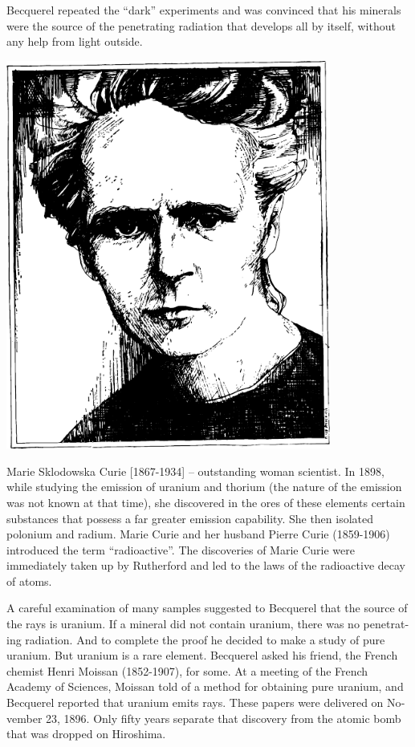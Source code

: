 Becquerel repeated the ``dark'' experiments and was convinced that his minerals were the source of the penetrating radiation that develops all by itself, without any help from light outside.


\begin{center}
\includegraphics[width=0.8\textwidth,angle=-0.5]{figures/curie.pdf}
\end{center}
{\small \textsf{{Marie Sklodowska Curie [1867-1934]}} -- \textsf{\footnotesize outstanding woman scien­tist. In 1898, while studying the emission of uranium and thorium (the nature of the emission was not known at that time), she discovered in the ores of these elements certain substances that pos­sess a far greater emission capability. She then isolated polonium and radium. Marie Curie and her husband Pierre Curie (1859-1906) introduced the term ``radioactive''. The discoveries of Marie Curie were immediately taken up by Rutherford and led to the laws of the radioactive decay of atoms.}}


A careful examination of many samples suggested to Becquerel that the source of the rays is uranium. If a mineral did not contain uranium, there was no penetrat­ing radiation. And to complete the proof he decided to make a study of pure uranium. But uranium is a rare element. Becquerel asked his friend, the French chemist Henri Moissan (1852-1907), for some. At a meeting of the French Academy of Sciences, Moissan told of a method for obtaining pure uranium, and Becquerel reported that uranium emits rays. These papers were delivered on No­vember 23, 1896. Only fifty years separate that discovery from the atomic bomb that was dropped on Hiroshima.


